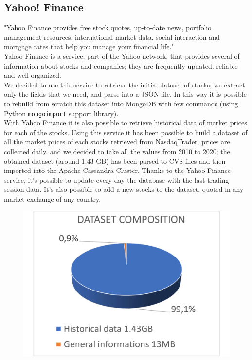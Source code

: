 \subsection{Yahoo! Finance}
"Yahoo Finance provides free stock quotes, up-to-date news, portfolio management
resources, international market data, social interaction and mortgage rates that
help you manage your financial life."\\
Yahoo Finance is a service, part of the Yahoo network, that provides several of
information about stocks and companies; they are frequently updated, reliable
and well organized.\\
We decided to use this service to retrieve the initial dataset of stocks; we
extract only the fields that we need, and parse into a JSON file. In this way it
is possible to rebuild from scratch this dataset into MongoDB with few commands
(using Python \texttt{mongoimport} support library).\\
With Yahoo Finance it is also possible to retrieve historical data of market
prices for each of the stocks. Using this service it has been possible to build
a dataset of all the market prices of each stocks retrieved from NasdaqTrader;
prices are collected daily, and we decided to take all the values from 2010 to
2020; the obtained dataset (around 1.43 GB) has been parsed to CVS files and then
imported into the Apache Cassandra Cluster. Thanks to the Yahoo Finance service,
it's possible to update every day the database with the last trading session
data. It's also possible to add a new stocks to the dataset, quoted in any
market exchange of any country.
\hfill \break
\begin{figure}[H]
	\begin{center}
		\includegraphics[scale=0.12]{img/dataset_comp.png}
	\end{center}
\end{figure}

